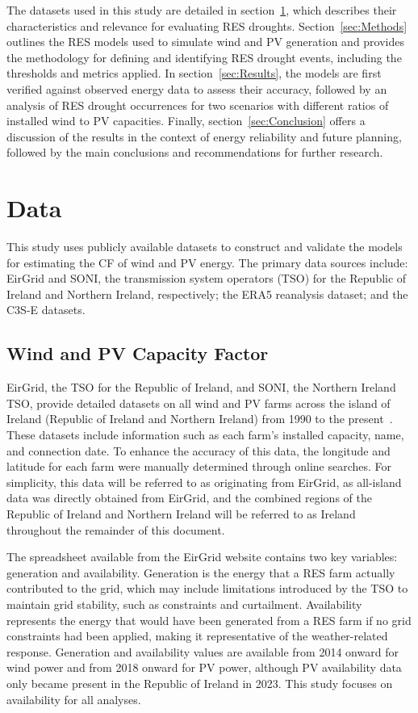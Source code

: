 \documentclass[a4paper, 11p1t]{article}
\begin{document}
The datasets used in this study are detailed in section~\ref{sec:Data}, which describes their characteristics and relevance for evaluating RES droughts. Section~\ref{sec:Methods} outlines the RES models used to simulate wind and PV generation and provides the methodology for defining and identifying RES drought events, including the thresholds and metrics applied. In section~\ref{sec:Results}, the models are first verified against observed energy data to assess their accuracy, followed by an analysis of RES drought occurrences for two scenarios with different ratios of installed wind to PV capacities. Finally, section~\ref{sec:Conclusion} offers a discussion of the results in the context of energy reliability and future planning, followed by the main conclusions and recommendations for further research.

\section{Data}
\label{sec:Data}

This study uses publicly available datasets to construct and validate the models for estimating the CF of wind and PV energy. The primary data sources include: EirGrid and SONI, the transmission system operators (TSO) for the Republic of Ireland and Northern Ireland, respectively; the ERA5 reanalysis dataset; and the C3S-E datasets.

\subsection{Wind and PV Capacity Factor}
\label{sec:eirgrid}

EirGrid, the TSO for the Republic of Ireland, and SONI, the Northern Ireland TSO, provide detailed datasets on all wind and PV farms across the island of Ireland (Republic of Ireland and Northern Ireland) from 1990 to the present~\cite{eirgrid2023spreadsheet}. These datasets include information such as each farm’s installed capacity, name, and connection date. To enhance the accuracy of this data, the longitude and latitude for each farm were manually determined through online searches. For simplicity, this data will be referred to as originating from EirGrid, as all-island data was directly obtained from EirGrid, and the combined regions of the Republic of Ireland and Northern Ireland will be referred to as Ireland throughout the remainder of this document.

The spreadsheet available from the EirGrid website contains two key variables: generation and availability. Generation is the energy that a RES farm actually contributed to the grid, which may include limitations introduced by the TSO to maintain grid stability, such as constraints and curtailment. Availability represents the energy that would have been generated from a RES farm if no grid constraints had been applied, making it representative of the weather-related response. Generation and availability values are available from 2014 onward for wind power and from 2018 onward for PV power, although PV availability data only became present in the Republic of Ireland in 2023. This study focuses on availability for all analyses.
\end{document}
